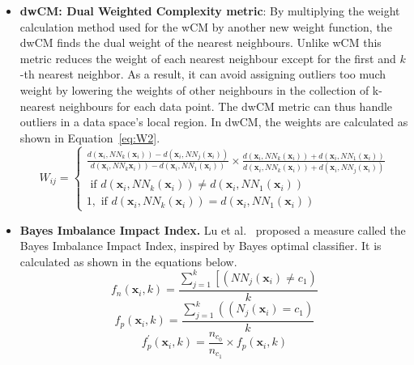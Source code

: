 \documentclass{article}
\begin{document}
\begin{itemize}
 \item \textbf{dwCM: Dual Weighted Complexity metric}: By multiplying the weight calculation method used for the wCM by another new weight function, the dwCM finds the dual weight of the nearest neighbours. Unlike wCM this metric reduces the weight of each nearest neighbour except for the first and $k$-th nearest neighbor. As a result, it can avoid assigning outliers too much weight by lowering the weights of other neighbours in the collection of k-nearest neighbours for each data point. The dwCM metric can thus handle outliers in a data space's local region. In dwCM, the weights are calculated as shown in Equation~\autoref{eq:W2}.
 \begin{equation}\label{eq:W2}
W_{i j}=\left\{\begin{array}{l}
\frac{d\left(\mathbf{x}_{i}, N N_{k}\left(\mathbf{x}_{i}\right)\right)-d\left(\mathbf{x}_{i}, N N_{j}\left(\mathbf{x}_{i}\right)\right)}{\left.d\left(\mathbf{x}_{i}, N N_{k} \mathbf{x}_{i}\right)\right)-d\left(\mathbf{x}_{i}, N N_{1}\left(\mathbf{x}_{i}\right)\right)} \times \frac{d\left(\mathbf{x}_{i}, N N_{k}\left(\mathbf{x}_{i}\right)\right)+d\left(\mathbf{x}_{i}, N N_{1}\left(\mathbf{x}_{i}\right)\right)}{d\left(\mathbf{x}_{i}, N N_{k}\left(\mathbf{x}_{i}\right)\right)+d\left(\mathbf{x}_{i}, N N_{j}\left(\mathbf{x}_{i}\right)\right)} \\
\text { if } d\left(\mathbf{x}_{i}, N N_{k}\left(\mathbf{x}_{i}\right)\right) \neq d\left(\mathbf{x}_{i}, N N_{1}\left(\mathbf{x}_{i}\right)\right) \\
1, \text { if } d\left(\mathbf{x}_{i}, N N_{k}\left(\mathbf{x}_{i}\right)\right)=d\left(\mathbf{x}_{i}, N N_{1}\left(\mathbf{x}_{i}\right)\right)
\end{array}\right.
\end{equation}
 
 \item \textbf{Bayes Imbalance Impact Index.} Lu et al.~\cite{luBayesImbalanceImpact2019} proposed a measure called the Bayes Imbalance Impact Index, inspired by Bayes optimal classifier. It is calculated as shown in the equations below.
 \begin{equation}
    f_{n}\left(\mathbf{x}_{i}, k\right)=\frac{\sum_{j=1}^{k}\left[\left(N N_{j}\left(\mathbf{x}_{i}\right) \neq c_{1}\right)\right.}{k}
\end{equation}
\begin{equation}
f_{p}\left(\mathbf{x}_{i}, k\right)=\frac{\sum_{j=1}^{k}\left(\left(N_{j}\left(\mathbf{x}_{i}\right)=c_{1}\right)\right.}{k} 
\end{equation}
\begin{equation}
f_{p}^{\prime}\left(\mathbf{x}_{i}, k\right)=\frac{n_{c_{0}}}{n_{c_{1}}} \times f_{p}\left(\mathbf{x}_{i}, k\right)
\end{equation}


\end{itemize}
\end{document}
